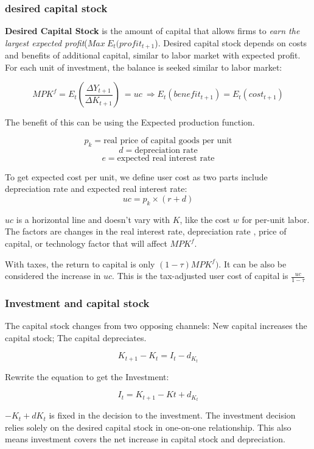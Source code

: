 \documentclass[10pt, a4paper]{article}
\begin{document}
            \subsubsection{desired capital stock}
                \textbf{Desired Capital Stock} is the amount of capital that allows firms to \emph{earn the largest expected profit}($Max\ E_t(profit_{t+1}$). Desired capital stock depends on costs and benefits of additional capital, similar to labor market with expected profit. For each unit of investment, the balance is seeked similar to labor market: 

                $$MPK^f = E_t(\frac{\Delta Y_{t+1}}{\Delta K_{t+1}})\  = uc\  \Rightarrow E_t(benefit_{t+1}) = E_t(cost_{t+1})$$

                The benefit of this can be using the Expected production function.

                $$p_k = \text{real\ price\ of\ capital\ goods\ per\ unit}$$
                $$d = \text{depreciation\ rate}$$
                $$e = \text{expected\ real\ interest\ rate}$$

                To get expected cost per unit, we define user cost as two parts include depreciation rate and expected real interest rate:
                $$uc = p_k \times (r + d)$$

                $uc$ is a horizontal line and doesn't vary with $K$, like the cost $w$ for per-unit labor. The factors are changes in the real interest rate, depreciation rate , price of capital, or technology factor that will affect $MPK^f$.

                With taxes, the return to capital is only $(1 - \tau)MPK^f)$. It can be also be considered the increase in $uc$. This is the tax-adjusted user cost of capital is $\frac{uc}{1 - \tau}$
            \subsubsection{Investment and capital stock }
                
                The capital stock changes from two opposing channels: New capital increases the capital stock; The capital depreciates. 

                $$K_{t + 1} - K_{t} = I_t - d_{K_t}$$

                Rewrite the equation to get the Investment: 

                $$I_t = K_{t + 1} - K{t} + d_{K_t}$$

                $-K_t + d{K_t}$ is fixed in the decision to the investment. The investment decision relies solely on the desired capital stock in one-on-one relationship. This also means investment covers the net increase in capital stock and depreciation.
                
\end{document}
